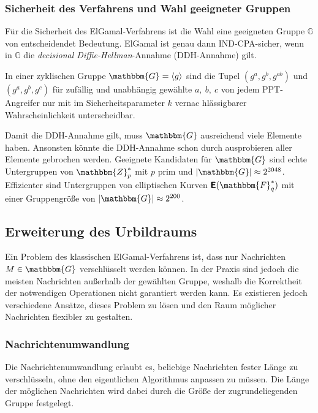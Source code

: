 \subsubsection{Sicherheit des Verfahrens und Wahl geeigneter Gruppen}
Für die Sicherheit des ElGamal-Verfahrens ist die Wahl eine geeigneten
Gruppe $\mathbb{G}$ von entscheidendet Bedeutung. ElGamal ist genau dann
IND-CPA-sicher, wenn in $\mathbb{G}$ die \emph{decisional
  Diffie-Hellman}-Annahme \indexDecisionalDiffieHellman (DDH-Annahme)
gilt.
\begin{definition}\label{def:ddh} In einer zyklischen
  Gruppe $\mathbbm{G} = \langle g \rangle$ sind die Tupel $(g^a, g^b,
  g^{ab})$ und $(g^a, g^b, g^c)$ für zufällig und unabhängig gewählte
  $a,~b,~c$ von jedem PPT-Angreifer nur mit im Sicherheitsparameter $k$
  vernac hlässigbarer Wahrscheinlichkeit unterscheidbar.
\end{definition}

Damit die DDH-Annahme gilt, muss $\mathbbm{G}$ ausreichend viele
Elemente haben. Ansonsten könnte die DDH-Annahme schon durch
ausprobieren aller Elemente gebrochen werden. Geeignete Kandidaten für
$\mathbbm{G}$ sind echte Untergruppen von $\mathbbm{Z}^*_p$ mit $p$ prim
und $|\mathbbm{G}| \approx 2^{2048}$. Effizienter sind Untergruppen von
elliptischen Kurven $\boldsymbol{\mathsf{E}}(\mathbbm{F}^*_q)$ mit einer
Gruppengröße von $|\mathbbm{G}| \approx 2^{200}$.

\subsection{Erweiterung des Urbildraums} Ein Problem des klassischen
ElGamal-Verfahrens ist, dass nur Nachrichten $M \in \mathbbm{G}$
verschlüsselt werden können. In der Praxis sind jedoch die meisten
Nachrichten außerhalb der gewählten Gruppe, weshalb die Korrektheit der
notwendigen Operationen nicht garantiert werden kann. Es existieren
jedoch verschiedene Ansätze, dieses Problem zu lösen und den Raum
möglicher Nachrichten flexibler zu gestalten.

\subsubsection{Nachrichtenumwandlung} Die Nachrichtenumwandlung
\indexMessageTransformation erlaubt es, beliebige Nachrichten fester
Länge zu verschlüsseln, ohne den eigentlichen Algorithmus anpassen zu
müssen. Die Länge der möglichen Nachrichten wird dabei durch die Größe
der zugrundeliegenden Gruppe festgelegt.

